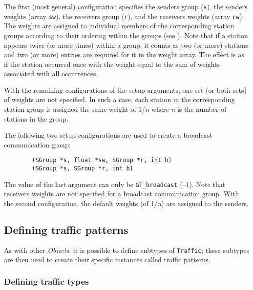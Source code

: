 The first (most general) configuration specifies the senders group ({\tt s}),
the senders weights (array {\tt sw}), the receivers group
({\tt r}), and the receivers weights (array {\tt rw}).
The weights are assigned to individual members of the corresponding
station groups according to their ordering within the groups
(see ).
Note that if a station appears twice (or more times)
within a group, it counts as two (or more)
stations and two (or more) entries are required for it in the weight array.
The effect is as if the station occurred once with the weight equal to
the sum of weights associated with all occurrences.

With the remaining configurations of the setup arguments,
one set (or both sets) of weights are not specified.
In such a case, each station in the corresponding station group is assigned
the same weight of 1/{\em n\/} where {\em n\/} is the number of stations in the group.

The following two setup
configurations are used to create a broadcast communication group:
\begin{verbatim}
        (SGroup *s, float *sw, SGroup *r, int b)
        (SGroup *s, SGroup *r, int b)
\end{verbatim}
The value of the last argument can only be {\tt GT\_broadcast} (--1).
Note that receivers weights are not specified for a broadcast communication
group.
With the second configuration, the default weights (of 1/{\em n\/})
are assigned to the senders.

\subsection{Defining traffic patterns}
\label{rm_cl_dt}

As with other {\em Objects}, it is possible to define subtypes of
{\tt Traffic};
these subtypes are then used to create their specific
instances called traffic patterns.

\subsubsection{Defining traffic types}
\label{rm_cl_dt_tt}

